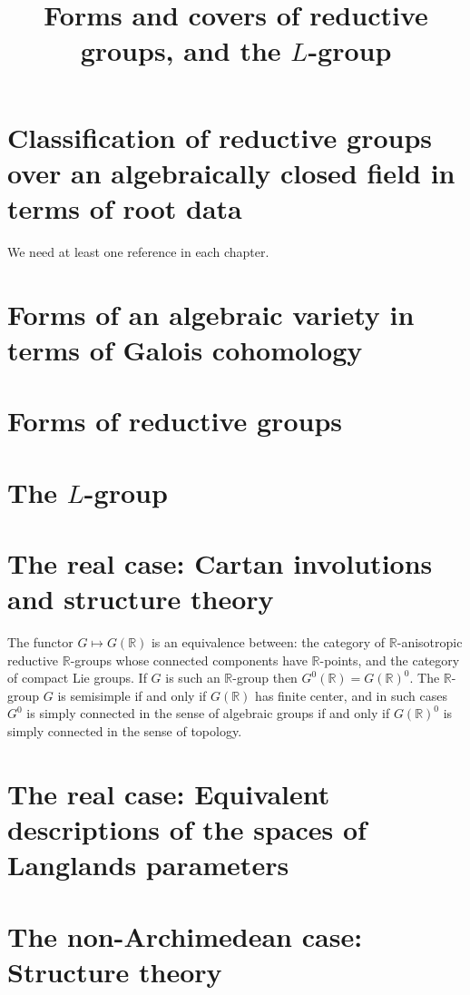 

%


\title{Forms and covers of reductive groups, and the $L$-group}


\maketitle

\label{section-phantom}

\tableofcontents

\section{Classification of reductive groups over an algebraically closed field in terms of root data}

We need at least one reference \cite{reference} in each chapter.

\section{Forms of an algebraic variety in terms of Galois cohomology}


\section{Forms of reductive groups}


\section{The $L$-group}


\section{The real case: Cartan involutions and structure theory}


\begin{theorem}
\label{theorem-functor-compactgroups}
 The functor $G\mapsto G(\mathbb R)$ is an equivalence between: the category of $\mathbb R$-anisotropic reductive $\mathbb R$-groups whose connected components have $\mathbb R$-points, and the category of compact Lie groups. If $G$ is such an $\mathbb R$-group then $G^0(\mathbb R)=G(\mathbb R)^0$. The $\mathbb R$-group $G$ is semisimple if and only if $G(\mathbb R)$ has finite center, and in such cases $G^0$ is simply connected in the sense of algebraic groups if and only if $G(\mathbb R)^0$ is simply connected in the sense of topology.
\end{theorem}


\section{The real case: Equivalent descriptions of the spaces of Langlands parameters}


\section{The non-Archimedean case: Structure theory}

















